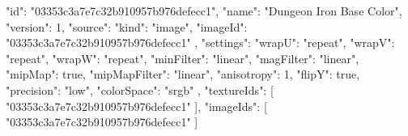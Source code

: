 {
  "id": "03353c3a7e7c32b910957b976defecc1",
  "name": "Dungeon Iron Base Color",
  "version": 1,
  "source": {
    "kind": "image",
    "imageId": "03353c3a7e7c32b910957b976defecc1"
  },
  "settings": {
    "wrapU": "repeat",
    "wrapV": "repeat",
    "wrapW": "repeat",
    "minFilter": "linear",
    "magFilter": "linear",
    "mipMap": true,
    "mipMapFilter": "linear",
    "anisotropy": 1,
    "flipY": true,
    "precision": "low",
    "colorSpace": "srgb"
  },
  "textureIds": [
    "03353c3a7e7c32b910957b976defecc1"
  ],
  "imageIds": [
    "03353c3a7e7c32b910957b976defecc1"
  ]
}
